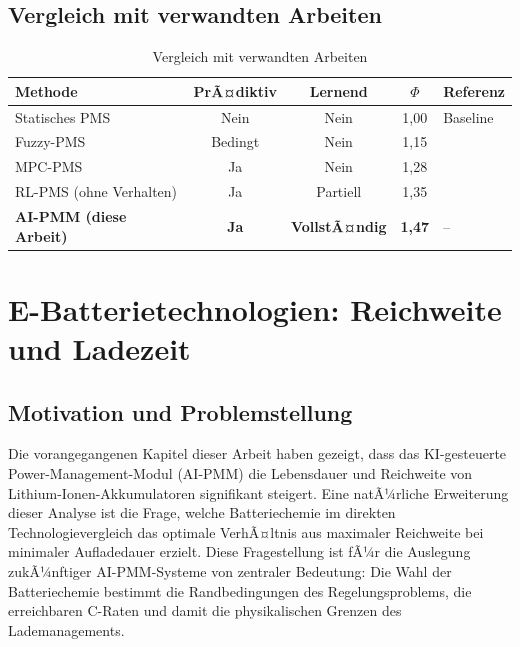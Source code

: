﻿\documentclass[12pt,a4paper]{article}
\begin{document}
	\subsection{Vergleich mit verwandten Arbeiten}
	
	\begin{table}[H]
		\centering
		\caption{Vergleich mit verwandten Arbeiten}
		\label{tab:comparison}
		\begin{tabular}{lcccl}
			\toprule
			\textbf{Methode} & \textbf{PrÃ¤diktiv} & \textbf{Lernend} & $\Phi$ & \textbf{Referenz} \\
			\midrule
			Statisches PMS & Nein & Nein & 1{,}00 & Baseline \\
			Fuzzy-PMS & Bedingt & Nein & 1{,}15 & \cite{Fuzzy2019} \\
			MPC-PMS & Ja & Nein & 1{,}28 & \cite{MPC2021} \\
			RL-PMS (ohne Verhalten) & Ja & Partiell & 1{,}35 & \cite{RL2022} \\
			\textbf{AI-PMM (diese Arbeit)} & \textbf{Ja} & \textbf{VollstÃ¤ndig} & \textbf{1{,}47} & -- \\
			\bottomrule
		\end{tabular}
	\end{table}
	
	\section{E-Batterietechnologien: Reichweite und Ladezeit}
	\label{sec:technologievergleich}

	\subsection{Motivation und Problemstellung}

	Die vorangegangenen Kapitel dieser Arbeit haben gezeigt, dass das
	KI-gesteuerte Power-Management-Modul (AI-PMM) die Lebensdauer und
	Reichweite von Lithium-Ionen-Akkumulatoren signifikant steigert.
	Eine natÃ¼rliche Erweiterung dieser Analyse ist die Frage, welche
	Batteriechemie im direkten Technologievergleich das optimale
	VerhÃ¤ltnis aus maximaler Reichweite bei minimaler Aufladedauer
	erzielt. Diese Fragestellung ist fÃ¼r die Auslegung zukÃ¼nftiger
	AI-PMM-Systeme von zentraler Bedeutung: Die Wahl der Batteriechemie
	bestimmt die Randbedingungen des Regelungsproblems, die erreichbaren
	C-Raten und damit die physikalischen Grenzen des Lademanagements.
\end{document}
